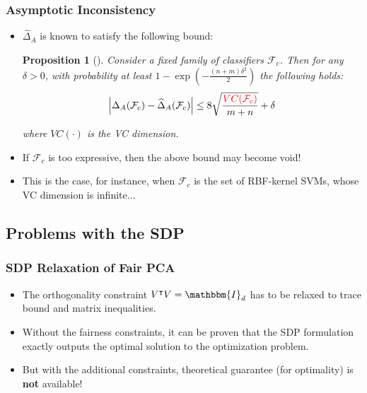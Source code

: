\documentclass{beamer}
\newtheorem{proposition}{Proposition}
\begin{document}
\begin{frame}
	\frametitle{Asymptotic Inconsistency}
	\begin{itemize}
		\item $\widehat{\Delta}_A$ is known to satisfy the following bound:
		\begin{proposition}[\cite{OA19}]
			Consider a fixed family of classifiers $\mathcal{F}_c$.
			Then for any $\delta > 0$, with probability at least $1 - \exp\left( - \frac{(n + m) \delta^2}{2} \right)$ the following holds:
			\begin{equation}
				\left| \Delta_A(\mathcal{F}_c) - \widehat{\Delta}_A(\mathcal{F}_c) \right| \leq 8 \sqrt{\frac{{\color{red} VC(\mathcal{F}_c)}}{m + n}} + \delta
			\end{equation}
			
			where $VC(\cdot)$ is the VC dimension.
		\end{proposition}
		
		\item If $\mathcal{F}_c$ is too expressive, then the above bound may become void!
				
		\item This is the case, for instance, when $\mathcal{F}_c$ is the set of RBF-kernel SVMs, whose VC dimension is infinite...
	\end{itemize}
\end{frame}


\subsection{Problems with the SDP}

\begin{frame}
	\frametitle{SDP Relaxation of Fair PCA}
	\begin{itemize}
		\item The orthogonality constraint $V^\intercal V = \mathbbm{I}_d$ has to be relaxed to trace bound and matrix inequalities.
		
		\item Without the fairness constraints, it can be proven that the SDP formulation exactly outputs the optimal solution to the optimization problem.
		
		\item But with the additional constraints, theoretical guarantee (for optimality) is {\bf not} available!
	\end{itemize}
\end{frame}
\end{document}
